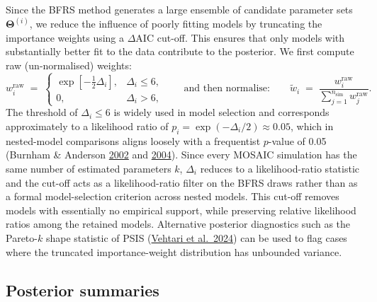 \documentclass[
]{book}
\begin{document}
Since the BFRS method generates a large ensemble of candidate parameter sets \(\boldsymbol{\Theta}^{(i)}\), we reduce the influence of poorly fitting models by truncating the importance weights using a \(\Delta \text{AIC}\) cut-off. This ensures that only models with substantially better fit to the data contribute to the posterior. We first compute raw (un-normalised) weights:
\begin{equation}
w_i^{\text{raw}} \;=\;
\begin{cases}
\exp\!\left[-\tfrac12 \Delta_i\right], & \Delta_i \le 6,\\[6pt]
0, & \Delta_i > 6,
\end{cases}
\qquad \text{and then normalise:} \qquad
\tilde{w}_i \;=\;
\dfrac{w_i^{\text{raw}}}{\displaystyle\sum_{j=1}^{n_{\text{sim}}} w_j^{\text{raw}}}.
\label{eq:aic-weights}
\end{equation}
The threshold of \(\Delta_i \le 6\) is widely used in model selection and corresponds approximately to a likelihood ratio of \(p_i = \exp(-\Delta_i/2) \approx 0.05\), which in nested-model comparisons aligns loosely with a frequentist \(p\)-value of 0.05 (Burnham \& Anderson \href{https://doi.org/10.1007/b97636}{2002} and \href{https://journals.sagepub.com/doi/abs/10.1177/0049124104268644}{2004}). Since every MOSAIC simulation has the same number of estimated parameters \(k\), \(\Delta_i\) reduces to a likelihood-ratio statistic and the cut-off acts as a likelihood-ratio filter on the BFRS draws rather than as a formal model-selection criterion across nested models. This cut-off removes models with essentially no empirical support, while preserving relative likelihood ratios among the retained models. Alternative posterior diagnostics such as the Pareto-\(k\) shape statistic of PSIS (\href{https://doi.org/10.48550/arXiv.1507.02646}{Vehtari et al.~2024}) can be used to flag cases where the truncated importance-weight distribution has unbounded variance.

\subsection{Posterior summaries}\label{posterior-summaries}
\end{document}
